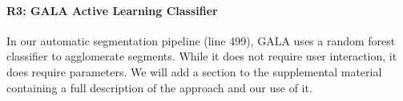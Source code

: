 \documentclass[10pt,twocolumn,letterpaper]{article}
\begin{document}
\paragraph{R3: GALA Active Learning Classifier}
In our automatic segmentation pipeline (line 499), GALA uses a random forest classifier to agglomerate segments. While it does not require user interaction, it does require parameters. We will add a section to the supplemental material containing a full description of the approach and our use of it. %

%
%
\end{document}
